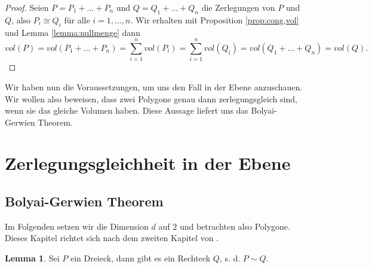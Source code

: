 \documentclass[11pt,titlepage]{article}
\theoremstyle{definition}
\newtheorem{lemma}[theorem]{Lemma}
\theoremstyle{remark}
\begin{document}
	\begin{proof}
		Seien $P=P_1+\ldots+P_n$ und $Q=Q_1+\ldots+Q_n$ die Zerlegungen von $P$ und 
		$Q$, also $P_i\cong Q_i$ für alle $i=1,\ldots,n$. Wir erhalten mit Proposition \ref{prop:cong,vol} und Lemma \ref{lemma:nullmenge} dann 
		\[vol(P)=vol(P_1+\ldots+P_n)=\sum_{i=1}^n vol(P_i)=\sum_{i=1}^n vol(Q_i)=vol(Q_1+\ldots+Q_n)=vol(Q).\]
	\end{proof}
	
	Wir haben nun die Voraussetzungen, um uns den Fall in der Ebene 
	anzuschauen. Wir wollen also beweisen, dass zwei Polygone genau 
	dann zerlegungsgleich sind, wenn sie das gleiche Volumen haben. 
	Diese Aussage liefert uns das Bolyai-Gerwien Theorem.

	\newpage
	
	\section{Zerlegungsgleichheit in der Ebene}
	
	\subsection{Bolyai-Gerwien Theorem}
	
	Im Folgenden setzen wir die Dimension $d$ auf $2$ und betrachten also Polygone. 
	Dieses Kapitel richtet sich nach dem zweiten Kapitel von \cite{Boltianskii}.
	
	\begin{lemma}
		Sei $P$ ein Dreieck, dann gibt es ein Rechteck $Q$, s. d. $P\sim Q$. \label{lemma:dreieck,rechteck}
	\end{lemma}
	
\end{document}
